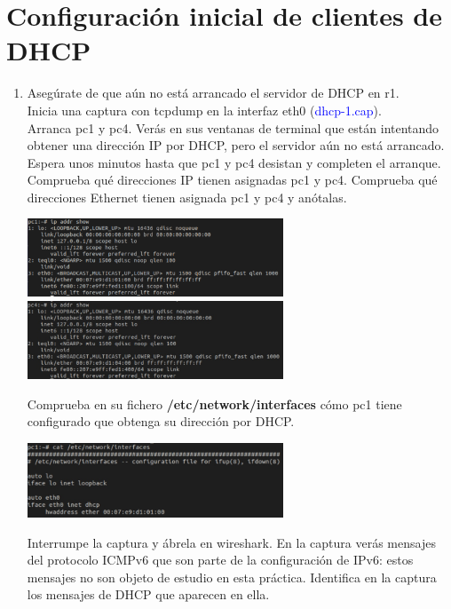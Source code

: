 \documentclass[12pt, a4paper]{report}
\begin{document}
\chapter{Configuración inicial de clientes de DHCP}
\begin{enumerate}
	\item Asegúrate de que aún no está arrancado el servidor de DHCP en r1.\\
	Inicia una captura con tcpdump en la interfaz eth0 (\textcolor{blue}{dhcp-1.cap}).\\
	Arranca pc1 y pc4. Verás en sus ventanas de terminal que están intentando obtener una dirección IP
	por DHCP, pero el servidor aún no está arrancado.\\
	Espera unos minutos hasta que pc1 y pc4 desistan y completen el arranque. Comprueba qué direcciones
	IP tienen asignadas pc1 y pc4. Comprueba qué direcciones Ethernet tienen asignada pc1 y pc4 y anótalas.\\
	\begin{center}
		\includegraphics[width=0.6\textwidth]{ej1_1_2}
		\includegraphics[width=0.6\textwidth]{ej1_2_2}
	\end{center}
	Comprueba en su fichero \textbf{/etc/network/interfaces} cómo pc1 tiene configurado que obtenga su dirección por DHCP.\\
	\begin{center}
		\includegraphics[width=0.6\textwidth]{ej1_3_2}
	\end{center}
	Interrumpe la captura y ábrela en wireshark. En la captura verás mensajes del protocolo ICMPv6 que
	son parte de la configuración de IPv6: estos mensajes no son objeto de estudio en esta práctica. Identifica
	en la captura los mensajes de DHCP que aparecen en ella.\\

\end{enumerate}
\end{document}
